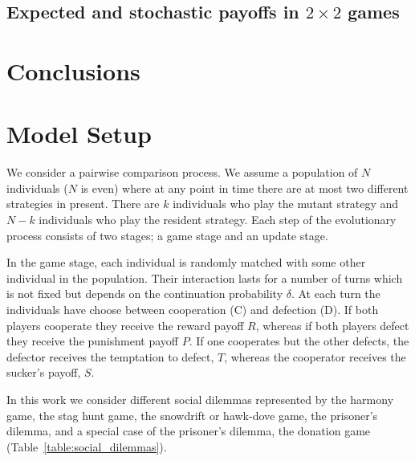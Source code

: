\documentclass[11pt]{article}
\theoremstyle{plainCl1}
\theoremstyle{plainCl2}
\begin{document}
\subsection{Expected and stochastic payoffs in $2 \times 2$ games}\label{section:2_by_2_games}

\section{Conclusions}\label{section:conclusions}

\appendix

\section{Model Setup}\label{appendix:methods}

We consider a pairwise comparison process. We assume a population of \(N\)
individuals (\(N\) is even) where at any point in time there are at most two
different strategies in present. There are \(k\) individuals who play the mutant
strategy and \(N - k\) individuals who play the resident strategy. Each step of
the evolutionary process consists of two stages; a game stage and an update
stage.

In the game stage, each individual is randomly matched with some other
individual in the population. Their interaction lasts for a number of turns
which is not fixed but depends on the continuation probability \(\delta\). At
each turn the individuals have choose between cooperation (C) and defection (D).
If both players cooperate they receive the reward payoff \(R\), whereas if both
players defect they receive the punishment payoff \(P\). If one cooperates but
the other defects, the defector receives the temptation to defect, \(T\),
whereas the cooperator receives the sucker's payoff, \(S\).

In this work we consider different social dilemmas represented by the harmony
game, the stag hunt game, the snowdrift or hawk-dove game, the prisoner's
dilemma, and a special case of the prisoner's dilemma, the donation game
(Table~\ref{table:social_dilemmas}).
\end{document}
